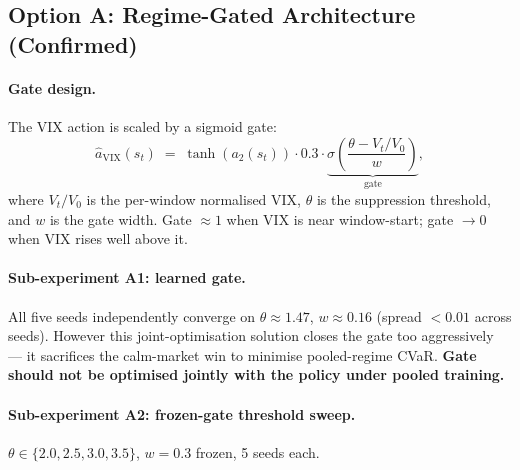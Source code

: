 \documentclass[11pt, a4paper]{article}
\begin{document}
\subsection{Option A: Regime-Gated Architecture (Confirmed)}

\paragraph{Gate design.} The VIX action is scaled by a sigmoid gate:
\begin{equation}
\widehat{a}_{\mathrm{VIX}}(s_t) \;=\; \tanh(a_2(s_t)) \cdot 0.3 \cdot
\underbrace{\sigma\!\left(\frac{\theta - V_t/V_0}{w}\right)}_{\text{gate}},
\end{equation}
where $V_t/V_0$ is the per-window normalised VIX, $\theta$ is the
suppression threshold, and $w$ is the gate width.
Gate $\approx 1$ when VIX is near window-start; gate $\to 0$ when VIX
rises well above it.

\paragraph{Sub-experiment A1: learned gate.}
All five seeds independently converge on $\theta \approx 1.47$, $w \approx 0.16$
(spread $< 0.01$ across seeds). However this joint-optimisation solution
closes the gate too aggressively --- it sacrifices the calm-market win to
minimise pooled-regime CVaR. \textbf{Gate should not be optimised jointly
with the policy under pooled training.}

\paragraph{Sub-experiment A2: frozen-gate threshold sweep.}
$\theta \in \{2.0, 2.5, 3.0, 3.5\}$, $w = 0.3$ frozen, 5 seeds each.
\end{document}
